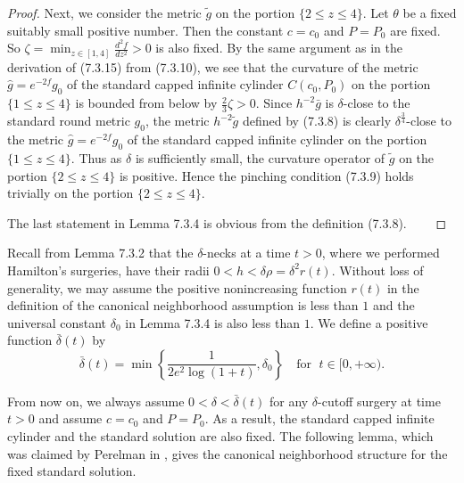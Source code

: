 \begin{proof}
Next, we consider the metric $\tilde{g}$ on the portion $\{2 \leq
z \leq 4\}$. Let $\theta$ be a fixed suitably small positive
number. Then the constant $c=c_0$ and $P=P_0$ are fixed. So $\zeta
= \min_{z \in [1,4]} \frac{d^2f}{dz^2}
> 0$ is also fixed. By the same argument as in the derivation of (7.3.15)
from (7.3.10), we see that the curvature of the metric $\hat{g} =
e^{-2f}g_0$ of the standard capped infinite cylinder $C(c_0,P_0)$
on the portion $\{ 1\leq z \leq 4\}$ is bounded from below by
$\frac{2}{3}\zeta >0$.  Since $h^{-2}\bar{g}$ is $\delta$-close to
the standard round metric $g_0$, the metric $h^{-2}\tilde{g}$
defined by (7.3.8) is clearly $\delta^{\frac{3}{4}}$-close to the
metric $\hat{g} = e^{-2f}g_0$ of the standard capped infinite
cylinder on the portion $\{ 1\leq z \leq 4 \}$. Thus as $\delta$
is sufficiently small, the curvature operator of $\tilde{g}$ on
the portion $\{2 \leq z \leq 4\}$ is positive. Hence the pinching
condition (7.3.9) holds trivially on the portion $\{2 \leq z \leq
4\}$.

The last statement in Lemma 7.3.4 is obvious from the definition
(7.3.8).
\mbox{ \ \ }\end{proof}

Recall from Lemma 7.3.2 that the $\delta$-necks at a time $t>0$,
where we performed Hamilton's surgeries, have their radii $0 < h <
\delta\rho =\delta^2r(t)$. Without loss of generality, we may
assume the positive nonincreasing function $r(t)$ in the
definition of the canonical neighborhood assumption is less than
$1$ and the universal constant $\delta_0$ in Lemma 7.3.4 is also
less than $1$. We define a positive function $\bar{\delta}(t)$ by
\begin{equation} \bar{\delta}(t) = \min\left\{\frac{1}{{2e^2\log(1+t)}},
\delta_0\right\} \quad \mbox{for } \; t\in [0,+\infty). %
\end{equation}

{}From now on, we always assume $0 < \delta < \bar{\delta}(t)$ for
any $\delta$-cutoff surgery at time $t>0$ and assume $c=c_0$ and
$P=P_0$. As a result, the standard capped infinite cylinder and
the standard solution are also fixed. The following lemma, which
was claimed by Perelman in \cite{P2}, gives the canonical
neighborhood structure for the fixed standard solution.

